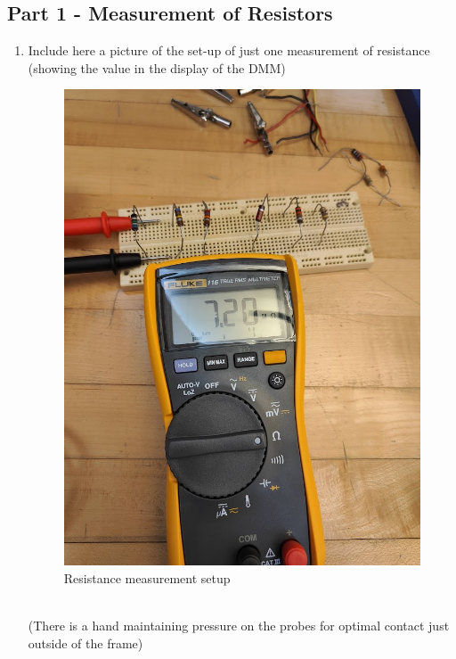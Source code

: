 \documentclass[titlepage]{article}
\begin{document}
\subsection*{Part 1 - Measurement of Resistors}
    \begin{enumerate} 
        \item Include here a picture of the set-up of just one measurement of resistance (showing the value in the display of the DMM)
            \begin{figure}[hbt!]
                \centering
                \caption{Resistance measurement setup}
                \includegraphics[scale = 0.2]{questions/measurement}
            \end{figure} 
            \\(There is a hand maintaining pressure on the probes for optimal contact just outside of the frame)


\end{enumerate}
\end{document}
